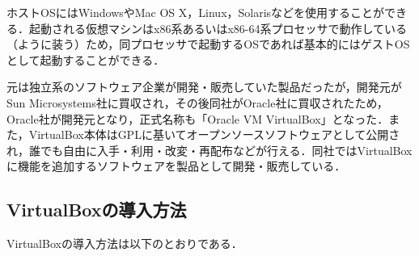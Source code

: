 ホストOSにはWindowsやMac OS X，Linux，Solarisなどを使用することができる．起動される仮想マシンはx86系あるいはx86-64系プロセッサで動作している（ように装う）ため，同プロセッサで起動するOSであれば基本的にはゲストOSとして起動することができる．

元は独立系のソフトウェア企業が開発・販売していた製品だったが，開発元がSun Microsystems社に買収され，その後同社がOracle社に買収されたため，Oracle社が開発元となり，正式名称も「Oracle VM VirtualBox」となった．また，VirtualBox本体はGPLに基いてオープンソースソフトウェアとして公開され，誰でも自由に入手・利用・改変・再配布などが行える．同社ではVirtualBoxに機能を追加するソフトウェアを製品として開発・販売している\cite{2016}．

\clearpage

\subsection{VirtualBoxの導入方法}
VirtualBoxの導入方法は以下のとおりである．
